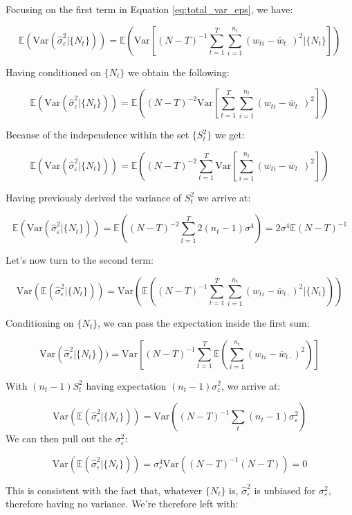 Focusing on the first term in Equation \ref{eq:total_var_eps}, we have: 

$$ \mathbb{E}(\text{Var}(\hat{\sigma}_\varepsilon^2|\{N_t\})) = \mathbb{E}\left(\text{Var}\left[(N-T)^{-1}\sum_{t=1}^T\sum_{i=1}^{n_t}(w_{ti}-\bar{w}_{t\cdot})^2|\{N_t\}\right]\right) $$

Having conditioned on $\{N_t\}$ we obtain the following:

$$ \mathbb{E}(\text{Var}(\hat{\sigma}_\varepsilon^2|\{N_t\})) = \mathbb{E}\left((N-T)^{-2}\text{Var}\left[\sum_{t=1}^T\sum_{i=1}^{n_t}(w_{ti}-\bar{w}_{t\cdot})^2\right]\right) $$

Because of the independence within the set $\{S_t^2\}$ we get:

$$ \mathbb{E}(\text{Var}(\hat{\sigma}_\varepsilon^2|\{N_t\})) = \mathbb{E}\left((N-T)^{-2}\sum_{t=1}^T\text{Var}\left[\sum_{i=1}^{n_t}(w_{ti}-\bar{w}_{t\cdot})^2\right]\right) $$

Having previously derived the variance of $S_t^2$ we arrive at:

$$ \mathbb{E}(\text{Var}(\hat{\sigma}_\varepsilon^2|\{N_t\})) = \mathbb{E}\left((N-T)^{-2}\sum_{t=1}^T2(n_t-1)\sigma^4\right) = 2\sigma^4\mathbb{E}(N-T)^{-1} $$

Let's now turn to the second term:

$$ \text{Var}(\mathbb{E}(\hat{\sigma}_\varepsilon^2|\{N_t\})) = \text{Var}(\mathbb{E}((N-T)^{-1}\sum_{t=1}^T\sum_{i=1}^{n_t}(w_{ti} - \bar{w}_{t\cdot})^2|\{N_t\})) $$

Conditioning on $\{N_t\}$, we can pass the expectation inside the first sum:

$$ \text{Var}(\hat{\sigma}_\varepsilon^2|\{N_t\})) = \text{Var}\left[(N-T)^{-1}\sum_{t=1}^T\mathbb{E}\left(\sum_{i=1}^{n_t}(w_{ti} - \bar{w}_{t\cdot})^2\right)\right] $$

With $(n_t-1)S_t^2$ having expectation $(n_t-1)\sigma_\varepsilon^2$, we arrive at:

$$ \text{Var}(\mathbb{E}(\hat{\sigma}_\varepsilon^2|\{N_t\})) = \text{Var}((N-T)^{-1}\sum_{t}(n_t-1)\sigma_\varepsilon^2) $$
We can then pull out the $\sigma_\varepsilon^2$:

$$ \text{Var}(\mathbb{E}(\hat{\sigma}_\varepsilon^2|\{N_t\})) = \sigma_\varepsilon^4\text{Var}((N-T)^{-1}(N-T)) = 0 $$

This is consistent with the fact that, whatever $\{N_t\}$ is, $\hat{\sigma}_\varepsilon^2$ is unbiased for $\sigma_\varepsilon^2$, therefore having no variance. We're therefore left with:

